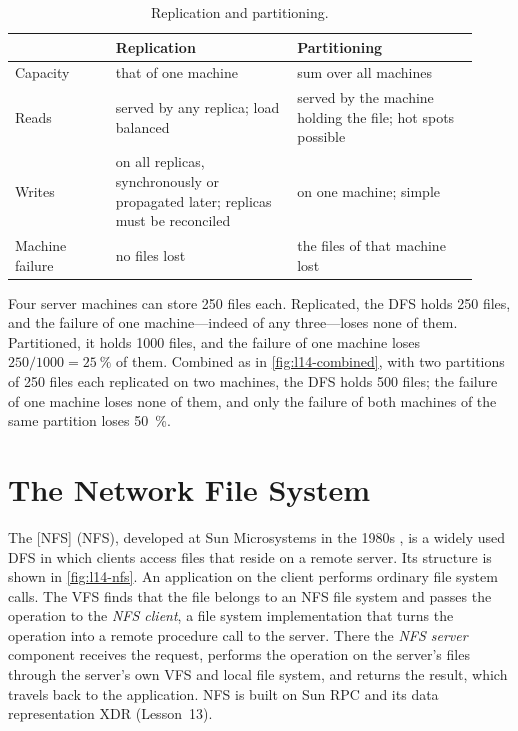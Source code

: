 \documentclass[../main.tex]{subfiles}
\begin{document}
\begin{table}[htbp]
  \centering
  \caption{Replication and partitioning.}
  \label{tab:l14-repl}
  \small
  \begin{tabular}{@{}>{\raggedright\arraybackslash}p{0.2\linewidth}>{\raggedright\arraybackslash}p{0.36\linewidth}>{\raggedright\arraybackslash}p{0.36\linewidth}@{}}
    \toprule
    & Replication & Partitioning \\
    \midrule
    Capacity & that of one machine & sum over all machines \\
    Reads & served by any replica; load balanced & served by the machine
      holding the file; hot spots possible \\
    Writes & on all replicas, synchronously or propagated later; replicas
      must be reconciled & on one machine; simple \\
    Machine failure & no files lost & the files of that machine lost \\
    \bottomrule
  \end{tabular}
\end{table}

\begin{example}
  Four server machines can store 250 files each.  Replicated, the DFS
  holds 250 files, and the failure of one machine---indeed of any
  three---loses none of them.  Partitioned, it holds \num{1000} files, and
  the failure of one machine loses $250/1000 = \SI{25}{\percent}$ of them.
  Combined as in \cref{fig:l14-combined}, with two partitions of 250 files
  each replicated on two machines, the DFS holds 500 files; the failure of
  one machine loses none of them, and only the failure of both machines of
  the same partition loses \SI{50}{\percent}.
\end{example}

\section{The Network File System}
\label{sec:l14-nfs}

The [NFS]
(NFS), developed at Sun Microsystems in the 1980s \cite{sandberg1985}, is a
widely used DFS in which clients access files that reside on a remote
server.  Its structure is shown in
\cref{fig:l14-nfs}.  An application on the client performs ordinary file
system calls.  The VFS finds that the file belongs to an NFS file system
and passes the operation to the \emph{NFS client}, a file system
implementation that turns the operation into a remote procedure call to
the server.  There the \emph{NFS server} component receives the request,
performs the operation on the server's files through the server's own VFS
and local file system, and returns the result, which travels back to the
application.  NFS is built on Sun RPC and its data
representation XDR (Lesson~13).
\end{document}
